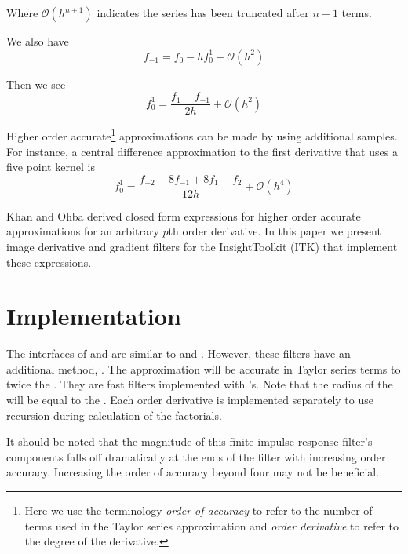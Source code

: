 \documentclass{InsightArticle}
\begin{document}
Where $\mathcal{O}(h^{n+1})$ indicates the series has been truncated after $n+1$
terms.

We also have
\begin{equation}
  f_{-1} = f_0 - h f^1_0 + \mathcal{O}(h^{2})
\end{equation}

Then we see
\begin{equation}
  f^1_0 = \frac{f_1 - f_{-1}} { 2 h } + \mathcal{O}(h^{2})
\end{equation}

Higher order accurate\footnote{Here we use the terminology \textit{order of
accuracy} to refer to the number of terms used in the Taylor series
approximation and \textit{order derivative} to refer to the degree of the
derivative.} approximations can be made by using additional samples.
For instance, a central difference approximation to the first derivative that uses a
five point kernel is
\begin{equation}
  f^1_0 = \frac{f_{-2} - 8 f_{-1} + 8 f_1 - f_2}{ 12 h } + \mathcal{O}(h^4)
\end{equation}

Khan and Ohba derived closed form expressions for higher order accurate
approximations for an arbitrary $p$th order derivative\cite{Khan1999,Khan2003}.
In this paper we present image derivative and gradient filters for the
InsightToolkit (ITK)\cite{itk} that implement these expressions.

\section{Implementation}

The interfaces of  and
 are similar to
 and .  However,
these filters have an additional method, .  The
approximation will be accurate in Taylor series terms to twice the
.  They are fast filters implemented with
's.  Note that the radius of the
 will be equal to the .
Each order derivative is implemented separately to use recursion during
calculation of the factorials\cite{Khan1999}.

It should be noted that the magnitude of this finite impulse response filter's components
falls off dramatically at the ends of the filter with increasing order accuracy.
Increasing the order of accuracy beyond four may not be beneficial.
\end{document}
